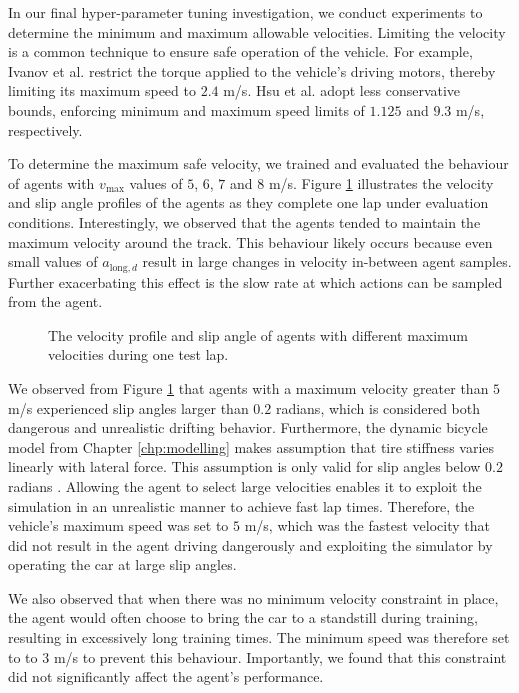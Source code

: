 In our final hyper-parameter tuning investigation, we conduct experiments to determine the minimum and maximum allowable velocities.
Limiting the velocity is a common technique to ensure safe operation of the vehicle.
For example, Ivanov et al. \cite{Ivanov2020} restrict the torque applied to the vehicle's driving motors, thereby limiting its maximum speed to $2.4$ m/s. 
Hsu et al. \cite{hsu2022} adopt less conservative bounds, enforcing minimum and maximum speed limits of $1.125$ and $9.3$ m/s, respectively.

To determine the maximum safe velocity, we trained and evaluated the behaviour of agents with $v_{\text{max}}$ values of $5$, $6$, $7$ and $8$ m/s.
Figure \ref{fig:vel_profile} illustrates the velocity and slip angle profiles of the agents as they complete one lap under evaluation conditions.
Interestingly, we observed that the agents tended to maintain the maximum velocity around the track.
This behaviour likely occurs because even small values of $a_{\text{long},d}$ result in large changes in velocity in-between agent samples.
Further exacerbating this effect is the slow rate at which actions can be sampled from the agent.

\begin{figure}[htb!]
    \centering
    
    \caption{The velocity profile and slip angle of agents with different maximum velocities during one test lap.}
    \label{fig:vel_profile}
\end{figure}

We observed from Figure \ref{fig:vel_profile} that agents with a maximum velocity greater than $5$ m/s experienced slip angles larger than $0.2$ radians, 
which is considered both dangerous and unrealistic drifting behavior.
Furthermore, the dynamic bicycle model from Chapter \ref{chp:modelling} makes assumption that tire stiffness varies linearly with lateral force.
This assumption is only valid for slip angles below $0.2$ radians \cite{Vorotovic2013}. 
Allowing the agent to select large velocities enables it to exploit the simulation in an unrealistic manner to achieve fast lap times.
Therefore, the vehicle's maximum speed was set to $5$ m/s, which was the fastest velocity that did not result in the agent driving dangerously and exploiting the simulator by operating the car at large slip angles.


We also observed that when there was no minimum velocity constraint in place, the agent would often choose to bring the car to a standstill during training, resulting in excessively long training times.
The minimum speed was therefore set to to $3$ m/s to prevent this behaviour.
Importantly, we found that this constraint did not significantly affect the agent's performance.





